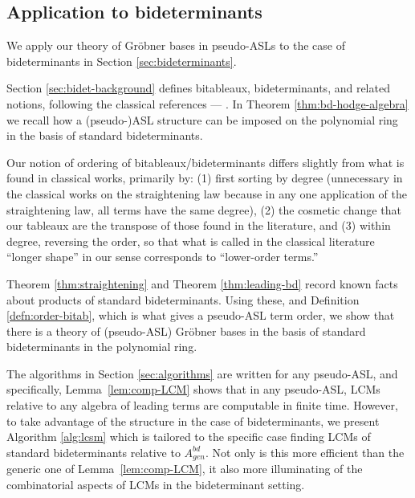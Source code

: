 \documentclass[11pt,reqno]{amsart}
\newcommand{\gb}{Gr\"{o}bner }
\theoremstyle{definition}
\numberwithin{equation}{section}
\begin{document}
\subsection{Application to bideterminants}

We apply our theory of \gb bases in pseudo-ASLs to the case of bideterminants in Section \ref{sec:bideterminants}.

Section \ref{sec:bidet-background} defines bitableaux, bideterminants, and related notions, following the classical references --- \cite{doubilet1974foundations, desarmenien1982invariant, grinberginvariant}. In Theorem \ref{thm:bd-hodge-algebra} we recall how a (pseudo-)ASL structure can be imposed on the polynomial ring in the basis of standard bideterminants.

Our notion of ordering of bitableaux/bideterminants differs slightly from what is found in classical works, primarily by: (1) first sorting by degree (unnecessary in the classical works on the straightening law because in any one application of the straightening law, all terms have the same degree), (2) the cosmetic change that our tableaux are the transpose of those found in the literature, and (3) within degree, reversing the order, so that what is called in the classical literature ``longer shape'' in our sense corresponds to ``lower-order terms.''



Theorem \ref{thm:straightening} and Theorem \ref{thm:leading-bd} record known facts about products of standard bideterminants. Using these, and Definition \ref{defn:order-bitab}, which is what gives a pseudo-ASL term order, we show that there is a theory of (pseudo-ASL) \gb bases in the basis of standard bideterminants in the polynomial ring.


The algorithms in Section \ref{sec:algorithms} are written for any pseudo-ASL, and specifically, Lemma~\ref{lem:comp-LCM} shows that in any pseudo-ASL, LCMs relative to any algebra of leading terms are computable in finite time. However, to take advantage of the structure in the case of bideterminants, we present Algorithm \ref{alg:lcsm} which is tailored to the specific case finding LCMs of standard bideterminants relative to $A_{gen}^{bd}$. Not only is this more efficient than the generic one of Lemma~\ref{lem:comp-LCM}, it also more illuminating of the combinatorial aspects of LCMs in the bideterminant setting.
\end{document}
